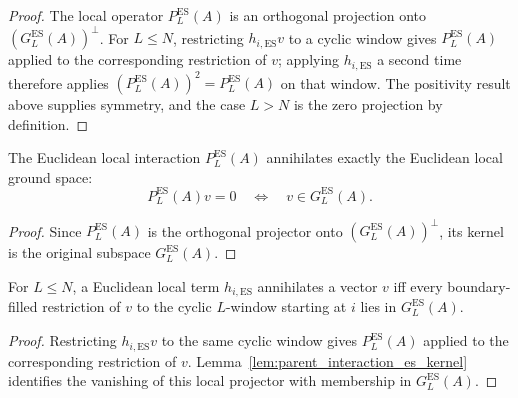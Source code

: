 \begin{proof}
    \leanok
    The local operator $P_L^{\mathrm{ES}}(A)$ is an orthogonal projection onto
    $(G_L^{\mathrm{ES}}(A))^\perp$. For $L\le N$, restricting
    $h_{i,\mathrm{ES}}v$ to a cyclic window gives
    $P_L^{\mathrm{ES}}(A)$ applied to the corresponding restriction of $v$; applying
    $h_{i,\mathrm{ES}}$ a second time therefore applies
    $(P_L^{\mathrm{ES}}(A))^2=P_L^{\mathrm{ES}}(A)$ on that window. The positivity
    result above supplies symmetry, and the case $L>N$ is the zero projection by
    definition.
\end{proof}

\begin{lemma}\label{lem:parent_interaction_es_kernel}
    \leanok
    The Euclidean local interaction $P_L^{\mathrm{ES}}(A)$ annihilates exactly the
    Euclidean local ground space:
    \[
        P_L^{\mathrm{ES}}(A)v=0 \quad\Longleftrightarrow\quad
        v\in G_L^{\mathrm{ES}}(A).
    \]
\end{lemma}

\begin{proof}
    \leanok
    Since $P_L^{\mathrm{ES}}(A)$ is the orthogonal projector onto
    $(G_L^{\mathrm{ES}}(A))^\perp$, its kernel is the original subspace
    $G_L^{\mathrm{ES}}(A)$.
\end{proof}

\begin{lemma}\label{lem:local_term_es_kernel_restrictions}
    \leanok
    For $L\le N$, a Euclidean local term $h_{i,\mathrm{ES}}$ annihilates a vector
    $v$ iff every boundary-filled restriction of $v$ to the cyclic $L$-window
    starting at $i$ lies in $G_L^{\mathrm{ES}}(A)$.
\end{lemma}

\begin{proof}
    \leanok
    Restricting $h_{i,\mathrm{ES}}v$ to the same cyclic window gives
    $P_L^{\mathrm{ES}}(A)$ applied to the corresponding restriction of $v$.
    Lemma~\ref{lem:parent_interaction_es_kernel} identifies the vanishing of this
    local projector with membership in $G_L^{\mathrm{ES}}(A)$.
\end{proof}

